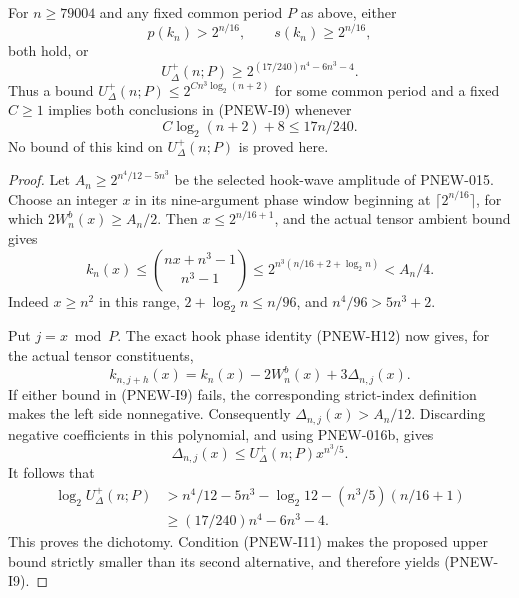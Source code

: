 \begin{theorem}[PNEW-016c]
For $n\ge79004$ and any fixed common period $P$ as above, either
\[
        p(k_n)>2^{n/16},\qquad s(k_n)\ge2^{n/16},
                                                        \tag{PNEW-I9}
\]
both hold, or
\[
       U_{\Delta}^+(n;P)\ge 2^{(17/240)n^4-6n^3-4}.              \tag{PNEW-I10}
\]
Thus a bound $U_{\Delta}^+(n;P)\le2^{C n^3\log_2(n+2)}$ for some common
period and a fixed $C\ge1$ implies both conclusions in
(PNEW-I9) whenever
\[
       C\log_2(n+2)+8\le17n/240.                     \tag{PNEW-I11}
\]
No bound of this kind on $U_{\Delta}^+(n;P)$ is proved here.
\end{theorem}
\begin{proof}
Let $A_n\ge2^{n^4/12-5n^3}$ be the selected hook-wave amplitude
of PNEW-015. Choose an integer $x$ in its nine-argument phase
window beginning at $\lceil2^{n/16}\rceil$, for which
$2W_n^b(x)\ge A_n/2$. Then $x\le2^{n/16+1}$, and the actual
tensor ambient bound gives
\[
 k_n(x)\le\binom{nx+n^3-1}{n^3-1}
       \le2^{n^3(n/16+2+\log_2n)}<A_n/4.             \tag{PNEW-I12}
\]
Indeed $x\ge n^2$ in this range,
$2+\log_2n\le n/96$, and $n^4/96>5n^3+2$.

Put $j=x\bmod P$. The exact hook phase identity (PNEW-H12)
now gives, for the actual tensor constituents,
\[
 k_{n,j+h}(x)=k_n(x)-2W_n^b(x)+3\Delta_{n,j}(x).
                                                        \tag{PNEW-I13}
\]
If either bound in (PNEW-I9) fails, the corresponding strict-index
definition makes the left side nonnegative. Consequently
$\Delta_{n,j}(x)>A_n/12$. Discarding negative coefficients in
this polynomial, and using PNEW-016b, gives
\[
                 \Delta_{n,j}(x)\le U_{\Delta}^+(n;P)x^{n^3/5}.
\]
It follows that
\[
\begin{split}
 \log_2 U_{\Delta}^+(n;P)
 &>n^4/12-5n^3-\log_2 12-(n^3/5)(n/16+1)\\
 &\ge (17/240)n^4-6n^3-4.
\end{split}
\]
This proves the dichotomy. Condition (PNEW-I11) makes the proposed
upper bound strictly smaller than its second alternative, and
therefore yields (PNEW-I9).
\end{proof}

